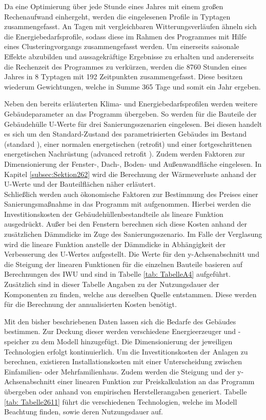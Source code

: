 Da eine Optimierung über jede Stunde eines Jahres mit einem großen Rechenaufwand einhergeht, werden die eingelesenen Profile in Typtagen zusammengefasst. 
An Tagen mit vergleichbaren Witterungsverläufen ähneln sich die Energiebedarfsprofile, sodass diese im Rahmen des Programmes mit Hilfe eines Clusteringvorgangs zusammengefasst werden.
Um einerseits saisonale Effekte abzubilden und aussagekräftige Ergebnisse zu erhalten und andererseits die Rechenzeit des Programmes zu verkürzen, werden die 8760 Stunden eines Jahres in 8 Typtagen mit 192 Zeitpunkten zusammengefasst.
Diese besitzen wiederum Gewichtungen, welche in Summe 365 Tage und somit ein Jahr ergeben.

Neben den bereits erläuterten Klima- und Energiebedarfsprofilen werden weitere Gebäudeparameter an das Programm übergeben.
So werden für die Bauteile der Gebäudehülle U-Werte für drei Sanierungsszenarien eingelesen.
Bei diesen handelt es sich um den Standard-Zustand des parametrisierten Gebäudes im Bestand (\glqq standard \grqq), einer normalen energetischen (\glqq retrofit\grqq) und einer fortgeschrittenen energetischen Nachrüstung (\glqq advanced retrofit \grqq).
Zudem werden Faktoren zur Dimensionierung der Fenster-, Dach-, Boden- und Außenwandfläche eingelesen.
In Kapitel \ref{subsec:Sektion262} wird die Berechnung der Wärmeverluste anhand der U-Werte und der Bauteilflächen näher erläutert.\\
Schließlich werden auch ökonomische Faktoren zur Bestimmung des Preises einer Sanierungsmaßnahme in das Programm mit aufgenommen. 
Hierbei werden die Investitionskosten der Gebäudehüllenbestandteile als lineare Funktion ausgedrückt.
Außer bei den Fenstern berechnen sich diese Kosten anhand der zusätzlichen Dämmdicke im Zuge des Sanierungsszenario.
Im Falle der Verglasung wird die lineare Funktion anstelle der Dämmdicke in Abhängigkeit der Verbesserung des U-Wertes aufgestellt.
Die Werte für den y-Achsenabschnitt und die Steigung der linearen Funktionen für die einzelnen Bauteile basieren auf Berechnungen des IWU \cite{Hinz.10.08.2015} und sind in Tabelle \ref{tab: TabelleA4} aufgeführt.
Zusätzlich sind in dieser Tabelle Angaben zu der Nutzungsdauer der Komponenten zu finden, welche aus derselben Quelle entstammen.
Diese werden für die Berechnung der annualisierten Kosten benötigt.

Mit den bisher beschriebenen Daten lassen sich die Bedarfe des Gebäudes bestimmen.
Zur Deckung dieser werden verschiedene Energieerzeuger und -speicher zu dem Modell hinzugefügt.
Die Dimensionierung der jeweiligen Technologien erfolgt kontinuierlich.
Um die Investitionskosten der Anlagen zu berechnen, existieren Installationskosten mit einer Unterscheidung zwischen Einfamilien- oder Mehrfamilienhaus.
Zudem werden die Steigung und der y-Achsenabschnitt einer linearen Funktion zur Preiskalkulation an das Programm übergeben oder anhand von empirischen Herstellerangaben generiert.
Tabelle \ref{tab: Tabelle2611} führt die verschiedenen Technologien, welche im Modell Beachtung finden, sowie deren Nutzungsdauer auf.

